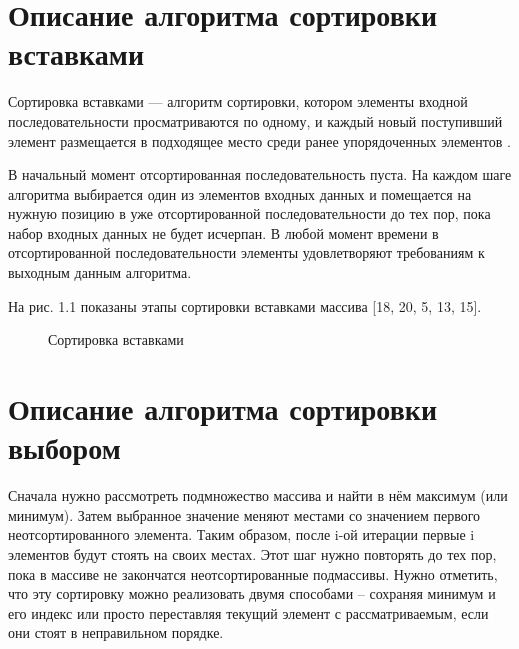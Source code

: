 \documentclass[12pt]{report}
\begin{document}
\section{Описание алгоритма сортировки вставками}

Сортировка вставками — алгоритм сортировки, котором элементы входной последовательности просматриваются по одному, и каждый новый поступивший элемент размещается в подходящее место среди ранее упорядоченных элементов \cite{habr}.

В начальный момент отсортированная последовательность пуста.
На каждом шаге алгоритма выбирается один из элементов входных данных и помещается на нужную позицию в уже отсортированной последовательности до тех пор, пока набор входных данных не будет исчерпан.
В любой момент времени в отсортированной последовательности элементы удовлетворяют требованиям к выходным данным алгоритма.

На рис. 1.1 показаны этапы сортировки вставками массива [18, 20,
5, 13, 15].

\newpage
\begin{figure}[h]
	\caption{Сортировка вставками}
	\label{figure:image}
\end{figure}

\section{Описание алгоритма сортировки выбором}

Сначала нужно рассмотреть подмножество массива и найти в нём
максимум (или минимум). Затем выбранное значение меняют местами со
значением первого неотсортированного элемента. Таким образом, после i-ой итерации первые i элементов будут стоять на своих местах. Этот шаг
нужно повторять до тех пор, пока в массиве не закончатся неотсортированные подмассивы.
Нужно отметить, что эту сортировку можно реализовать двумя способами – сохраняя минимум и его индекс или просто переставляя текущий
элемент с рассматриваемым, если они стоят в неправильном порядке. 
\end{document}

